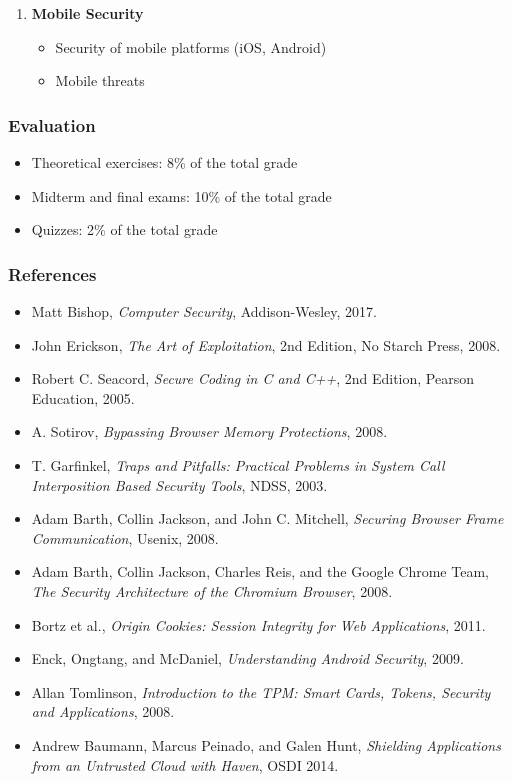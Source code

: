 \documentclass[12pt]{article}
\begin{document}
\begin{enumerate}
    \item \textbf{Mobile Security}
    \begin{itemize}
        \item Security of mobile platforms (iOS, Android)
        \item Mobile threats
    \end{itemize}
\end{enumerate}

\subsubsection*{Evaluation}
\begin{itemize}
    \item Theoretical exercises: 8\% of the total grade
    \item Midterm and final exams: 10\% of the total grade
    \item Quizzes: 2\% of the total grade
\end{itemize}

\subsubsection*{References}
\begin{itemize}
    \item Matt Bishop, \textit{Computer Security}, Addison-Wesley, 2017.
    \item John Erickson, \textit{The Art of Exploitation}, 2nd Edition, No Starch Press, 2008.
    \item Robert C. Seacord, \textit{Secure Coding in C and C++}, 2nd Edition, Pearson Education, 2005.
    \item A. Sotirov, \textit{Bypassing Browser Memory Protections}, 2008.
    \item T. Garfinkel, \textit{Traps and Pitfalls: Practical Problems in System Call Interposition Based Security Tools}, NDSS, 2003.
    \item Adam Barth, Collin Jackson, and John C. Mitchell, \textit{Securing Browser Frame Communication}, Usenix, 2008.
    \item Adam Barth, Collin Jackson, Charles Reis, and the Google Chrome Team, \textit{The Security Architecture of the Chromium Browser}, 2008.
    \item Bortz et al., \textit{Origin Cookies: Session Integrity for Web Applications}, 2011.
    \item Enck, Ongtang, and McDaniel, \textit{Understanding Android Security}, 2009.
    \item Allan Tomlinson, \textit{Introduction to the TPM: Smart Cards, Tokens, Security and Applications}, 2008.
    \item Andrew Baumann, Marcus Peinado, and Galen Hunt, \textit{Shielding Applications from an Untrusted Cloud with Haven}, OSDI 2014.
\end{itemize}
\end{document}
